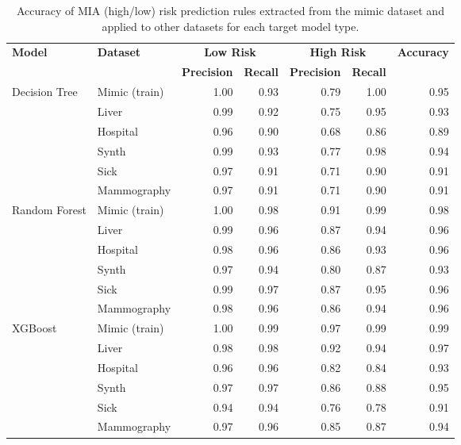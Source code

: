 \begin{table}[t!]
    \caption{Accuracy of MIA (high/low) risk prediction rules extracted from the mimic dataset and applied to other datasets for each target model type.}%
    \label{table:accuracy_combined}
    \small
    \centering
    \begin{tabular}{llrrrrr}
        \toprule
        \multirow{2}{*}{{\bf Model}} & \multirow{2}{*}{{\bf Dataset}} & \multicolumn{2}{c}{{\bf Low Risk}} & \multicolumn{2}{c}{{\bf High Risk}} & \multirow{2}{*}{{\bf Accuracy}} \\
        & & {\bf Precision} & {\bf Recall} & {\bf Precision} & {\bf Recall} & \\
        \midrule
        \multirow{6}{*}{Decision Tree} 
        & Mimic (train) & 1.00 & 0.93 & 0.79 & 1.00 & 0.95\\
        & Liver & 0.99 & 0.92 & 0.75 & 0.95 & 0.93\\
        & Hospital & 0.96 & 0.90 & 0.68 & 0.86 & 0.89\\
        & Synth & 0.99 & 0.93 & 0.77 & 0.98 & 0.94\\
        & Sick & 0.97 & 0.91 & 0.71 & 0.90 & 0.91\\
        & Mammography & 0.97 & 0.91 & 0.71 & 0.90 & 0.91\\
        \midrule
        \multirow{6}{*}{Random Forest} 
        & Mimic (train) & 1.00 & 0.98 & 0.91 & 0.99 & 0.98\\
        & Liver & 0.99 & 0.96 & 0.87 & 0.94 & 0.96\\
        & Hospital & 0.98 & 0.96 & 0.86 & 0.93 & 0.96\\
        & Synth & 0.97 & 0.94 & 0.80 & 0.87 & 0.93\\
        & Sick & 0.99 & 0.97 & 0.87 & 0.95 & 0.96\\
        & Mammography & 0.98 & 0.96 & 0.86 & 0.94 & 0.96\\
        \midrule
        \multirow{6}{*}{XGBoost} 
        & Mimic (train) & 1.00 & 0.99 & 0.97 & 0.99 & 0.99\\
        & Liver & 0.98 & 0.98 & 0.92 & 0.94 & 0.97\\
        & Hospital & 0.96 & 0.96 & 0.82 & 0.84 & 0.93\\
        & Synth & 0.97 & 0.97 & 0.86 & 0.88 & 0.95\\
        & Sick & 0.94 & 0.94 & 0.76 & 0.78 & 0.91\\
        & Mammography & 0.97 & 0.96 & 0.85 & 0.87 & 0.94\\
        \bottomrule
    \end{tabular}
\end{table}
